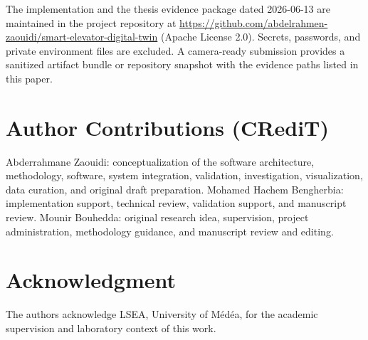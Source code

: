 \documentclass[journal]{IEEEtran}
\begin{document}
The implementation and the thesis evidence package dated 2026-06-13 are maintained in the project repository at \url{https://github.com/abdelrahmen-zaouidi/smart-elevator-digital-twin} (Apache License 2.0). Secrets, passwords, and private environment files are excluded. A camera-ready submission provides a sanitized artifact bundle or repository snapshot with the evidence paths listed in this paper.

\section*{Author Contributions (CRediT)}

Abderrahmane Zaouidi: conceptualization of the software architecture, methodology, software, system integration, validation, investigation, visualization, data curation, and original draft preparation. Mohamed Hachem Bengherbia: implementation support, technical review, validation support, and manuscript review. Mounir Bouhedda: original research idea, supervision, project administration, methodology guidance, and manuscript review and editing.

\section*{Acknowledgment}

The authors acknowledge LSEA, University of M\'ed\'ea, for the academic supervision and laboratory context of this work.



\end{document}
